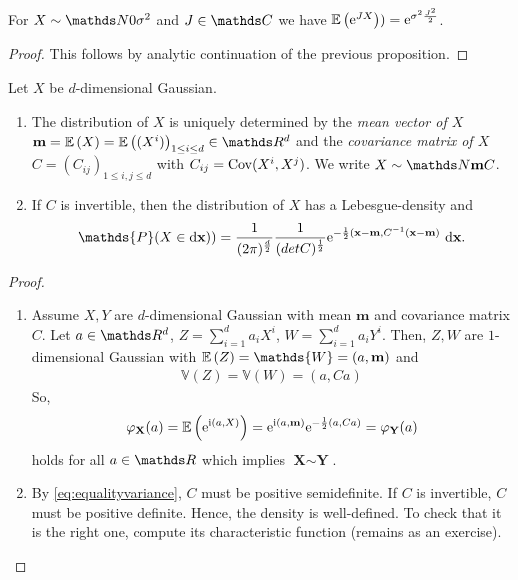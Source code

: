 \begin{cor}
For $X \sim \N{0}{\sigma^2}$ and $J\in \C$ we have $\mathbb{E}\left(\mathrm{e}^{JX}\right))=\mathrm{e}^{\sigma^2 \frac{J^2}{2}}$.
\begin{proof}
This follows by analytic continuation of the previous proposition.
\end{proof}
\end{cor}

\begin{thm}
Let $X$ be $d$-dimensional Gaussian.
\begin{enumerate}[label=(\alph*)]
\item The distribution of $X$ is uniquely determined by the \emph{mean vector of $X$} $\textbf{m}=\E{X}=\E{(X^i)}_{1\leq i\leq d} \in \Rd$ and the \emph{covariance matrix of $X$} $C=(C_{ij})_{1\leq i,j\leq d}$ with $C_{ij}=\operatorname{Cov}(X^i,X^j)$.
We write $X \sim \N{\textbf{m}}{C}$.
\item If $C$ is invertible, then the distribution of $X$ has a Lebesgue-density and
\begin{align*}
\mathds{P}(X \in \mathrm{d}\textbf{x}))=\frac{1}{(2 \pi)^{\frac{d}{2}}} \frac{1}{(det C)^{\frac{1}{2}}} \e^{-\frac{1}{2}(\textbf{x}-\textbf{m},C^{-1}(\textbf{x}-\textbf{m})}~\mathrm{d}\textbf{x}.
\end{align*}
\end{enumerate}
\begin{proof}
\begin{enumerate}[label=(\alph*)]
\item Assume $X,Y$ are $d$-dimensional Gaussian with mean $\textbf{m}$ and covariance matrix $C$.
Let $a\in \Rd$, $Z=\sum_{i=1}^d a_iX^i$, $W=\sum_{i=1}^d a_i Y^i$.
Then, $Z,W$ are $1$-dimensional Gaussian with $\E{Z}=\mathds{W}=(a,\textbf{m})$ and
\begin{align}\label{eq:equalityvariance}
\mathds{V}(Z)=\mathds{V}(W)=(a,Ca)
\end{align}
So,
\begin{align*}
\varphi_{\textbf{X}}(a)=\mathbb{E}\left(\mathrm{e}^{\mathrm{i} (a,X)}\right)=\mathrm{e}^{\mathrm{i} (a,\textbf{m})}\mathrm{e}^{-\frac{1}{2}(a,Ca)}=\varphi_\textbf{Y}(a)
\end{align*}
holds for all $a\in\R$ which implies $\textbf{X}\sim \textbf{Y}$.
\item By \eqref{eq:equalityvariance}, $C$ must be positive semidefinite. If $C$ is invertible, $C$ must be positive definite.
Hence, the density is well-defined.
To check that it is the right one, compute its characteristic function (remains as an exercise). \qedhere
\end{enumerate}
\end{proof}
\end{thm}

